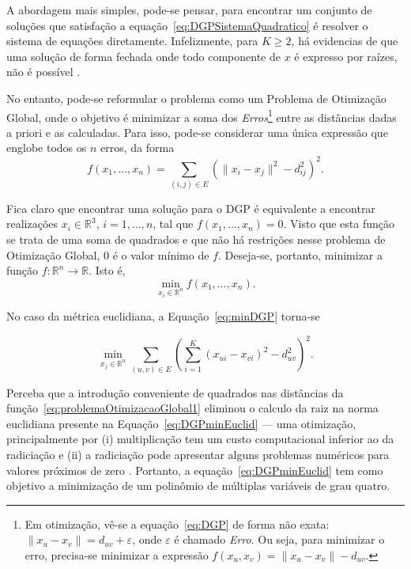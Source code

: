 A abordagem mais simples, pode-se pensar, para encontrar um conjunto de soluções que satisfação a equação~\ref{eq:DGPSistemaQuadratico} é resolver o sistema de equações diretamente. Infelizmente, para $K \geq 2$, há evidencias de que uma solução de forma fechada onde todo componente de $x$ é expresso por raízes, não é possível \cite{carlileBook31Coloquio}. 

No entanto, pode-se reformular o problema como um Problema de Otimização Global, onde o objetivo é minimizar a soma dos \textit{Erros}\footnote{Em otimização, vê-se a equação~\ref{eq:DGP} de forma não exata: $\lVert x_u - x_v \rVert = d_{uv} + \varepsilon$, onde $\varepsilon$ é chamado \textit{Erro}. Ou seja, para minimizar o erro, precisa-se minimizar a expressão $f(x_u,x_v) = \lVert x_u - x_v \rVert - d_{uv}$.} entre as distâncias dadas a priori e as calculadas. Para isso, pode-se considerar uma única expressão que englobe todos os $n$ erros, da forma
\begin{equation}
	f(x_1,\dots,x_n) = \sum_{(i,j)\in E} \left(\lVert x_i - x_j \rVert^2 - d_{ij}^2\right)^2.
		\label{eq:problemaOtimizacaoGlobal1}
\end{equation}

Fica claro que encontrar uma solução para o DGP é equivalente a encontrar realizações $x_i \in \mathbb{R}^3$, $i=1,\dots,n$, tal que $f(x_1,\dots,x_n) = 0$. Visto que esta função se trata de uma soma de quadrados e que não há restrições nesse problema de Otimização Global, 0 é o valor mínimo de $f$. Deseja-se, portanto, minimizar a função $f: \mathbb{R}^n \longrightarrow \mathbb{R}$. Isto é,
\begin{equation}
	\label{eq:minDGP}
	\min_{x_i \in \mathbb{R}^n} f(x_1,\dots,x_n).
\end{equation}

No caso da métrica euclidiana, a Equação~\ref{eq:minDGP} torna-se

\begin{equation}
 \min_{x_j \in \mathbb{R}^n} \sum_{(u,v)\in E} \left(\sum_{i=1}^{K}(x_{ui} - x_{vi})^2 - d_{uv}^2\right)^2.
 \label{eq:DGPminEuclid}
\end{equation}

Perceba que a introdução conveniente de quadrados nas distâncias da função~\ref{eq:problemaOtimizacaoGlobal1} eliminou o calculo da raiz na norma euclidiana presente na Equação~\ref{eq:DGPminEuclid} --- uma otimização, principalmente por (i) multiplicação tem um custo computacional inferior ao da radiciação \cite{intructionsTableFog} e (ii) a radiciação pode apresentar alguns problemas numéricos para valores próximos de zero \cite{libertiMdgpContinousToDiscrete}. Portanto, a equação~\ref{eq:DGPminEuclid} tem como objetivo a minimização de um polinômio de múltiplas variáveis de grau quatro.
\\

